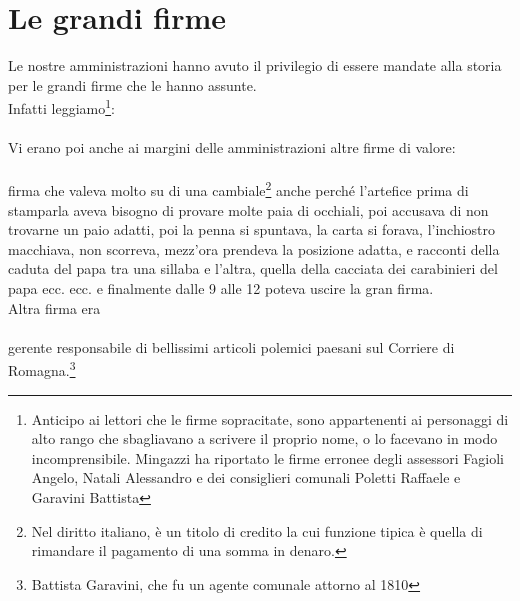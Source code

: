 \documentclass[10pt]{memoir} %
\begin{document}
\chapter{Le grandi firme}
Le nostre amministrazioni hanno avuto il privilegio di essere mandate alla storia per le grandi firme che le hanno assunte.\\
Infatti leggiamo\footnote{Anticipo ai lettori che le firme sopracitate, sono appartenenti ai personaggi di alto rango che sbagliavano a scrivere il proprio nome, o lo facevano in modo incomprensibile. Mingazzi ha riportato le firme erronee degli assessori Fagioli Angelo, Natali Alessandro e dei consiglieri comunali Poletti Raffaele e Garavini Battista}:
\\   
\normalfont
\\Vi erano poi anche ai margini delle amministrazioni altre firme di valore:
\\ \\
\normalfont
firma che valeva molto su di una cambiale\footnote{Nel diritto italiano, è un titolo di credito la cui funzione tipica è quella di rimandare il pagamento di una somma in denaro.} anche perché l'artefice prima di stamparla aveva bisogno di provare molte paia di occhiali, poi accusava di non trovarne un paio adatti, poi la penna si spuntava, la carta si forava, l'inchiostro macchiava, non scorreva, mezz'ora prendeva la posizione adatta, e racconti della caduta del papa tra una sillaba e l'altra, quella della cacciata dei carabinieri del papa ecc. ecc. e finalmente dalle 9 alle 12 poteva uscire la gran firma. \\
Altra firma era
\\ \\ \normalfont
gerente responsabile di bellissimi articoli polemici paesani sul Corriere di Romagna.\footnote{Battista Garavini, che fu un agente comunale attorno al 1810}
\end{document}
